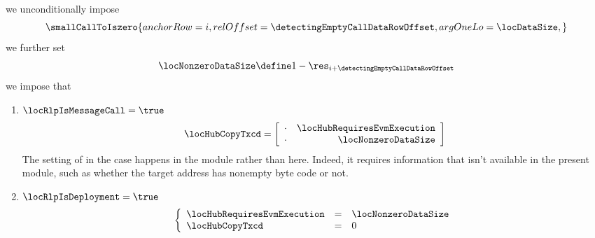 \item[\underline{\underline{Row n$°(i + \detectingEmptyCallDataRowOffset)$: detecting empty call data:}}]
	we unconditionally impose
	\[
		\smallCallToIszero {
			anchorRow = i                                ,
			relOffset = \detectingEmptyCallDataRowOffset ,
			argOneLo  = \locDataSize                     ,
		}
	\]
	we further set
	\[
		\locNonzeroDataSize \define 1 - \res_{i + \detectingEmptyCallDataRowOffset}
	\]
	we impose that
	\begin{enumerate}
		\item
			\If $\locRlpIsMessageCall = \true$ \Then
			\[
				\locHubCopyTxcd =
				\left[ \begin{array}{cr}
					\cdot & \locHubRequiresEvmExecution \\
					\cdot & \locNonzeroDataSize         \\
				\end{array} \right]
			\]
			\saNote{}
			The setting of \locHubRequiresEvmExecution{} in the \locRlpIsMessageCall{} case
			happens in the \hubMod{} module rather than here.
			Indeed, it requires information that isn't available in the present module,
			such as whether the target address has nonempty byte code or not.
		\item
			\If $\locRlpIsDeployment = \true$ \Then
			\[
				\left\{ \begin{array}{lcl}
					\locHubRequiresEvmExecution & = & \locNonzeroDataSize \\
					\locHubCopyTxcd             & = & 0                   \\
				\end{array} \right.
			\]
	\end{enumerate}
